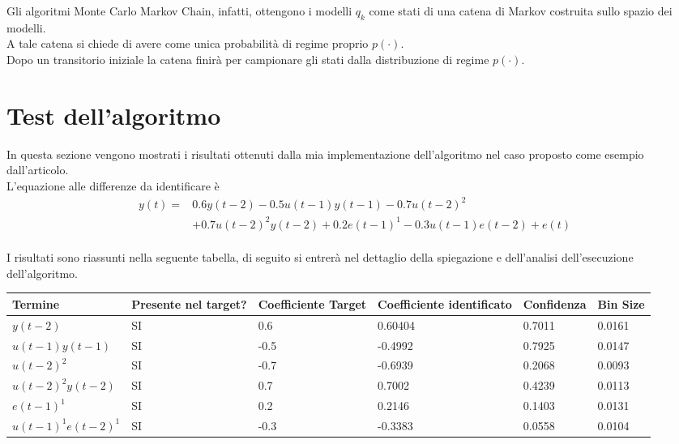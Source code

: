 \documentclass[10pt,a4paper,oneside,openany,noindent]{report}
\begin{document}
Gli algoritmi Monte Carlo Markov Chain, infatti, ottengono i modelli $q_k$ 
come stati di una catena di Markov costruita sullo spazio dei modelli.\\ A  tale catena si chiede di avere come unica probabilità di regime proprio $p(\cdot)$.\vspace{2em}\\
Dopo un transitorio iniziale la catena finirà per campionare gli stati dalla distribuzione di regime $p(\cdot)$.







\section*{Test dell'algoritmo}
In questa sezione vengono mostrati i risultati ottenuti dalla mia implementazione dell'algoritmo nel caso proposto come esempio dall'articolo.\\ \vspace{2em}
L'equazione alle differenze da identificare è
\begin{align*}
y(t)=&0.6y(t-2)-0.5u(t-1)y(t-1)-0.7u(t-2)^2\\
&+0.7u(t-2)^2y(t-2)+0.2e(t-1)^1-0.3u(t-1)e(t-2)+e(t)
\end{align*}
\vspace{2em} \\
I risultati sono riassunti nella seguente tabella, di seguito si entrerà nel dettaglio della spiegazione e dell'analisi dell'esecuzione dell'algoritmo. \vspace{2em} \\
\begin{tabular}{|p{8em}|p{4em}|p{8em}|p{8em}|p{4em}|p{4em}|}
\hline
Termine & Presente  nel target? & Coefficiente Target & Coefficiente identificato & Confidenza & Bin Size\\
\hline
$y(t-2)$ & SI & 0.6 & 0.60404 &  0.7011 & 0.0161 \\ 
\hline
$u(t-1)y(t-1)$ & SI &  -0.5 &  -0.4992  &  0.7925 &   0.0147\\
\hline
$u(t-2)^2$ & SI &  -0.7 &  -0.6939  &  0.2068 &   0.0093\\ 
\hline
$u(t-2)^2y(t-2)$ & SI &   0.7 &   0.7002  &  0.4239  &  0.0113\\ 
\hline
$e(t-1)^1$  & SI &  0.2  &  0.2146  &  0.1403 &   0.0131\\
\hline 
 $u(t-1)^1e(t-2)^1$  & SI & -0.3 &  -0.3383  &  0.0558  &  0.0104\\
\hline 
\end{tabular}
\vspace{2em} \\
\end{document}

